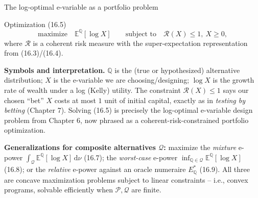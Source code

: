\documentclass[aspectratio=169,10pt]{beamer}
\newcommand{\EE}{\mathbb{E}}
\newcommand{\1}{\mathbb{1}}
\begin{document}
\begin{frame}{The log-optimal e-variable as a portfolio problem}

\begin{block}{Optimization (16.5)}
\[
\text{maximize} \quad \EE^{\mathbb Q}[\log X] \qquad \text{subject to} \quad \mathcal R(X) \le 1,\ X \ge 0,
\]
where $\mathcal R$ is a coherent risk measure with the super-expectation representation from (16.3)/(16.4).
\end{block}

\textbf{Symbols and interpretation.} $\mathbb Q$ is the (true or hypothesized) alternative distribution; $X$ is the e-variable we are choosing/designing; $\log X$ is the growth rate of wealth under a log (Kelly) utility. The constraint $\mathcal R(X)\le 1$ says our chosen ``bet'' $X$ costs at most $1$ unit of initial capital, exactly as in \emph{testing by betting} (Chapter 7). Solving (16.5) is precisely the log-optimal e-variable design problem from Chapter 6, now phrased as a coherent-risk-constrained portfolio optimization.

\vspace{2mm}
\textbf{Generalizations for composite alternatives $\mathcal Q$:} maximize the \emph{mixture} e-power $\int_{\mathcal Q} \EE^{\mathbb Q}[\log X]\,\mathrm d\nu$ (16.7); the \emph{worst-case} e-power $\inf_{\mathbb Q \in \mathcal Q}\EE^{\mathbb Q}[\log X]$ (16.8); or the \emph{relative} e-power against an oracle numeraire $E^*_{\mathbb Q}$ (16.9). All three are concave maximization problems subject to linear constraints -- i.e., convex programs, solvable efficiently when $\mathcal P, \mathcal Q$ are finite.

\end{frame}
\end{document}
